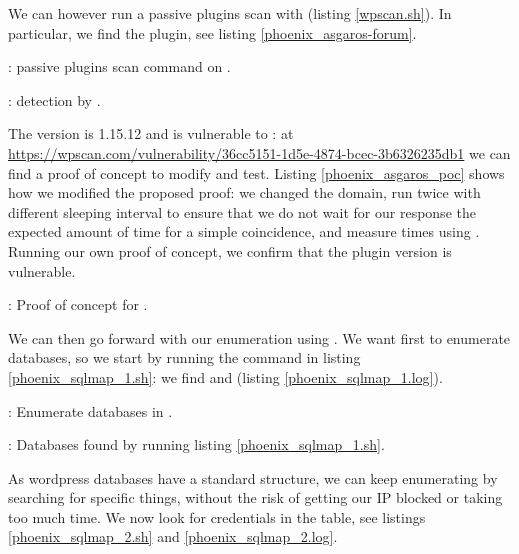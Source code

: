 \par We can however run a passive plugins scan with  (listing \ref{wpscan.sh}). In particular, we find the  plugin, see listing \ref{phoenix_asgaros-forum}.
\begin{listing}
  \caption{:  passive plugins scan command on .}
  \label{wpscan.sh}
\end{listing}
\begin{listing}
  
  \caption{:  detection by .}
  \label{phoenix_asgaros-forum}
\end{listing}
\par The version is 1.15.12 and is vulnerable to : at \url{https://wpscan.com/vulnerability/36cc5151-1d5e-4874-bcec-3b6326235db1} we can find a proof of concept to modify and test. Listing \ref{phoenix_asgaros_poc} shows how we modified the proposed proof: we changed the domain, run  twice with different sleeping interval to ensure that we do not wait for our response the expected amount of time for a simple coincidence, and measure times using . Running our own proof of concept, we confirm that the plugin version is vulnerable.
\begin{listing}
  \tiny
  \caption{: Proof of concept for .}
  \label{phoenix_asgaros_poc}
\end{listing}
\par We can then go forward with our enumeration using . We want first to enumerate databases, so we start by running the command in listing \ref{phoenix_sqlmap_1.sh}: we find  and  (listing \ref{phoenix_sqlmap_1.log}).
\begin{listing}
  \caption{: Enumerate databases in .}
  \label{phoenix_sqlmap_1.sh}
\end{listing}
\begin{listing}
  
  \caption{: Databases found by running listing \ref{phoenix_sqlmap_1.sh}.}
  \label{phoenix_sqlmap_1.log}
\end{listing}
\par As wordpress databases have a standard structure, we can keep enumerating by searching for specific things, without the risk of getting our IP blocked or taking too much time. We now look for credentials in the  table, see listings \ref{phoenix_sqlmap_2.sh} and \ref{phoenix_sqlmap_2.log}.
